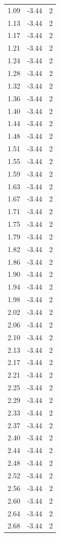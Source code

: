 \begin{longtable}{lrr}
  1.09 & -3.44 & 2 \\
  1.13 & -3.44 & 2 \\
  1.17 & -3.44 & 2 \\
  1.21 & -3.44 & 2 \\
  1.24 & -3.44 & 2 \\
  1.28 & -3.44 & 2 \\
  1.32 & -3.44 & 2 \\
  1.36 & -3.44 & 2 \\
  1.40 & -3.44 & 2 \\
  1.44 & -3.44 & 2 \\
  1.48 & -3.44 & 2 \\
  1.51 & -3.44 & 2 \\
  1.55 & -3.44 & 2 \\
  1.59 & -3.44 & 2 \\
  1.63 & -3.44 & 2 \\
  1.67 & -3.44 & 2 \\
  1.71 & -3.44 & 2 \\
  1.75 & -3.44 & 2 \\
  1.79 & -3.44 & 2 \\
  1.82 & -3.44 & 2 \\
  1.86 & -3.44 & 2 \\
  1.90 & -3.44 & 2 \\
  1.94 & -3.44 & 2 \\
  1.98 & -3.44 & 2 \\
  2.02 & -3.44 & 2 \\
  2.06 & -3.44 & 2 \\
  2.10 & -3.44 & 2 \\
  2.13 & -3.44 & 2 \\
  2.17 & -3.44 & 2 \\
  2.21 & -3.44 & 2 \\
  2.25 & -3.44 & 2 \\
  2.29 & -3.44 & 2 \\
  2.33 & -3.44 & 2 \\
  2.37 & -3.44 & 2 \\
  2.40 & -3.44 & 2 \\
  2.44 & -3.44 & 2 \\
  2.48 & -3.44 & 2 \\
  2.52 & -3.44 & 2 \\
  2.56 & -3.44 & 2 \\
  2.60 & -3.44 & 2 \\
  2.64 & -3.44 & 2 \\
  2.68 & -3.44 & 2 \\

\end{longtable}
